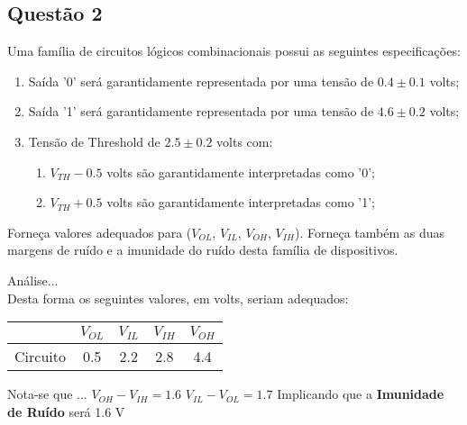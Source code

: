 \documentclass{article}
\begin{document}
\newpage
        \subsection{Questão 2}
            \begin{exercise}
                Uma família de circuitos lógicos combinacionais possui as seguintes especificações:
                    \begin{enumerate}
                        \item Saída '0' será garantidamente representada por uma tensão de $0.4 \pm 0.1$ volts;
                        \item Saída '1' será garantidamente representada por uma tensão de $4.6 \pm 0.2$ volts;
                        \item Tensão de Threshold de $2.5 \pm 0.2$ volts com:
                            \begin{enumerate}[noitemsep]
                                \item $V_{TH}-0.5$ volts são garantidamente interpretadas como '0';
                                \item $V_{TH}+0.5$ volts são garantidamente interpretadas como '1';
                            \end{enumerate}
                    \end{enumerate}
                Forneça valores adequados para ($V_{OL}$, $V_{IL}$, $V_{OH}$, $V_{IH}$). Forneça também as duas margens de ruído e a imunidade do ruído desta família de dispositivos.
            \end{exercise}
            \begin{resolution}
                Análise...\\
                Desta forma os seguintes valores, em volts, seriam adequados:
                    \begin{table}[H]
                        \centering  
                        \begin{tabular}[]{l|cccc}\hline
                                     & $V_{OL}$ & $V_{IL}$ & $V_{IH}$ & $V_{OH}$\\\hline
                            Circuito & 0.5      & 2.2      & 2.8      & 4.4\\\hline
                        \end{tabular}
                    \end{table}
                Nota-se que ...
                    $V_{OH} - V_{IH} = 1.6$
                    $V_{IL} - V_{OL} = 1.7$
                Implicando que a \textbf{Imunidade de Ruído} será 1.6 V
            \end{resolution}
\end{document}
